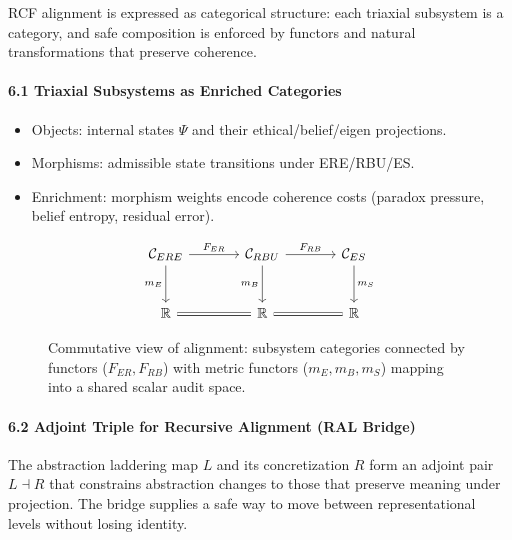 \documentclass[
]{article}
\providecommand{\tightlist}{%
  \setlength{\itemsep}{0pt}\setlength{\parskip}{0pt}}
\begin{document}
RCF alignment is expressed as categorical structure: each triaxial
subsystem is a category, and safe composition is enforced by functors
and natural transformations that preserve coherence.

\paragraph{\texorpdfstring{\textbf{6.1 Triaxial Subsystems as Enriched
Categories}}{6.1 Triaxial Subsystems as Enriched Categories}}\label{triaxial-subsystems-as-enriched-categories}

\begin{itemize}
\tightlist
\item
  Objects: internal states \(\Psi\) and their ethical/belief/eigen
  projections.
\item
  Morphisms: admissible state transitions under ERE/RBU/ES.
\item
  Enrichment: morphism weights encode coherence costs (paradox pressure,
  belief entropy, residual error).
\end{itemize}

\begin{figure}[htbp]
\centering
\[
\begin{tikzcd}[column sep=large,row sep=large]
\mathcal{C}_{ERE} \arrow[r, "F_{ER}"] \arrow[d, "m_E"'] & \mathcal{C}_{RBU} \arrow[r, "F_{RB}"] \arrow[d, "m_B"'] & \mathcal{C}_{ES} \arrow[d, "m_S"] \\
\mathbb{R} \arrow[r, equal] & \mathbb{R} \arrow[r, equal] & \mathbb{R}
\end{tikzcd}
\]
\caption{Commutative view of alignment: subsystem categories connected by functors ($F_{ER},F_{RB}$) with metric functors ($m_E,m_B,m_S$) mapping into a shared scalar audit space.}
\label{fig:alignment-commutative}
\end{figure}

\paragraph{\texorpdfstring{\textbf{6.2 Adjoint Triple for Recursive
Alignment (RAL
Bridge)}}{6.2 Adjoint Triple for Recursive Alignment (RAL Bridge)}}\label{adjoint-triple-for-recursive-alignment-ral-bridge}

The abstraction laddering map \(L\) and its concretization \(R\) form an
adjoint pair \(L \dashv R\) that constrains abstraction changes to those
that preserve meaning under projection. The bridge supplies a safe way
to move between representational levels without losing identity.
\end{document}
